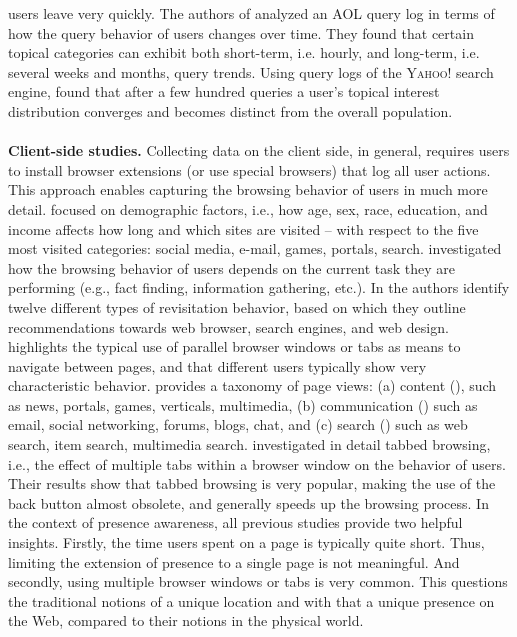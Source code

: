\documentclass[11pt,fleqn,twoside]{article}
\begin{document}
users leave very quickly. The authors of \cite{Beitzel07TemporalAnalysis} analyzed an \textsc{AOL} query log in terms of how the query behavior of users changes over time. They found that certain topical categories can exhibit both short-term, i.e. hourly, and long-term, i.e. several weeks and months, query trends. Using query logs of the \textsc{Yahoo!} search engine, \cite{Wedig06LargeScaleAnalysis} found that after a few hundred queries a user's topical interest distribution converges and becomes distinct from the overall population. 
\\
\\
\textbf{Client-side studies.}
Collecting data on the client side, in general, requires users to install browser extensions (or use special browsers) that log all user actions. This approach enables capturing the browsing behavior of users in much more detail. \cite{Goel12WhoDoesWhat} focused on demographic factors, i.e., how age, sex, race, education, and income affects how long and which sites are visited -- with respect to the five most visited categories: social media, e-mail, games, portals, search. \cite{Kellar06TheImpact} investigated how the browsing behavior of users depends on the current task they are performing (e.g., fact finding, information gathering, etc.).
In \cite{Adar08LargeScaleAnalysis} the authors identify twelve different types of revisitation behavior, based on which they outline recommendations towards web browser, search engines, and web design. \cite{Weinreich08NotQuite} highlights the typical use of parallel browser windows or tabs as means to navigate between pages, and that different users typically show very characteristic behavior. \cite{Kumar10Kumar} provides a taxonomy of page views: (a) content (), such as news, portals, games, verticals, multimedia, (b) communication () such as email, social networking, forums, blogs, chat, and (c) search () such as web search, item search, multimedia search. \cite{Dubroy10AStudyOfTabbed,Zhang11MeasuringWebPage,Huang12NoSearchResult} investigated in detail tabbed browsing, i.e., the effect of multiple tabs within a browser window on the behavior of users. Their results show that tabbed browsing is very popular, making the use of the back button almost obsolete, and generally 
speeds up the browsing process. In the context of presence awareness, all previous studies provide two helpful insights. Firstly, the time users spent on a page is typically quite short. Thus, limiting the extension of presence to a single page is not meaningful. And secondly, using multiple browser windows or tabs is very common. This questions the traditional notions of a unique location and with that a unique presence on the Web, compared to their notions in the physical world.
\end{document}
